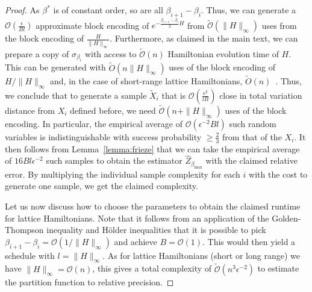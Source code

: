 \documentclass[aps,pra,amsmath,amssymb,twocolumn,10pt]{revtex4-2}
\theoremstyle{definition}
\begin{document}
\begin{proof}
	As $\beta^*$ is of constant order, so are all $\beta_{i+1}-\beta_i$. Thus, we can generate a $\mathcal{O}(\frac{\epsilon}{Bl})$ approximate block encoding of $e^{-\tfrac{\beta_{i+1}-\beta_{i}}{2}H}$ from $\widetilde{\mathcal{O}}(\|H\|_\infty)$ uses from the block encoding of $\tfrac{H}{\|H\|_\infty}$. Furthermore, as claimed in the main text, we can prepare a copy of $\sigma_{\beta_i}$ with access to $\widetilde{\mathcal{O}}(n)$ Hamiltonian evolution time of $H$. This can be generated with $\widetilde{O}(n\|H\|_\infty)$ uses of the block encoding of $H/\|H\|_\infty$ and, in the case of short-range lattice Hamiltonians, $\widetilde{O}(n)$~\cite{Haah_2021}. Thus, we conclude that to generate a sample $\widetilde{X}_i$ that is $\mathcal{O}(\tfrac{\epsilon^2}{lB})$ close in total variation distance from $X_i$ defined before, we need $\widetilde{\mathcal{O}}(n+\|H\|_\infty)$ uses of the block encoding.
	In particular, the empirical average of $\mathcal{O}(\epsilon^{-2}Bl)$ such random variables is indistinguishable with success probability $\geq\frac{2}{3}$ from that of the $X_i$. It then follows from Lemma~\ref{lemma:frieze} that we can take the empirical average of $16Bl\epsilon^{-2}$ such samples to obtain the estimator $\hat{Z}_{\beta_{\max}}$ with the claimed relative error. By multiplying the individual sample complexity for each $i$ with the cost to generate one sample, we get the claimed complexity. 
	
	Let us now discuss how to choose the parameters to obtain the claimed runtime for lattice Hamiltonians. Note that it follows from an application of the Golden-Thompson inequality and H\"older inequalities that it is possible to pick $\beta_{i+1}-\beta_i=\mathcal{O}(1/\|H\|_\infty)$ and achieve $B=\mathcal{O}(1)$. This would then yield a schedule with $l=\|H\|_\infty$. As for lattice Hamiltonians (short or long range) we have $\|H\|_\infty=\mathcal{O}(n)$, this gives a total complexity of $\widetilde{\mathcal{O}}(n^3\epsilon^{-2})$ to estimate the partition function to relative precision. 
\end{proof}
\end{document}
